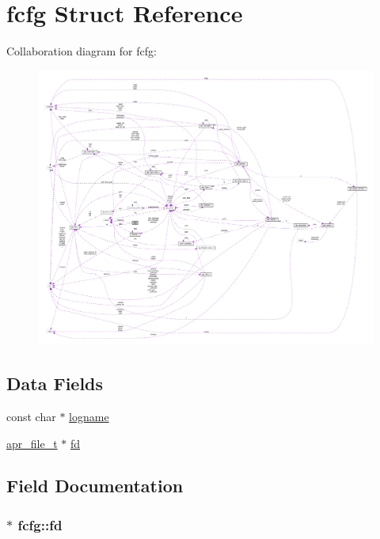 \hypertarget{structfcfg}{}\section{fcfg Struct Reference}
\label{structfcfg}


Collaboration diagram for fcfg\+:
\nopagebreak
\begin{figure}[H]
\begin{center}
\leavevmode
\includegraphics[width=350pt]{structfcfg__coll__graph}
\end{center}
\end{figure}
\subsection*{Data Fields}
\begin{DoxyCompactItemize}
\item 
const char $\ast$ \hyperlink{structfcfg_aaba2969110d511bcb367726c42517bc6}{logname}
\item 
\hyperlink{structapr__file__t}{apr\+\_\+file\+\_\+t} $\ast$ \hyperlink{structfcfg_a540fdb7fbff714985e8019977bfcef51}{fd}
\end{DoxyCompactItemize}


\subsection{Field Documentation}
\subsubsection[{\texorpdfstring{fd}{fd}}]{$\ast$ fcfg\+::fd}\hypertarget{structfcfg_a540fdb7fbff714985e8019977bfcef51}{}\label{structfcfg_a540fdb7fbff714985e8019977bfcef51}
